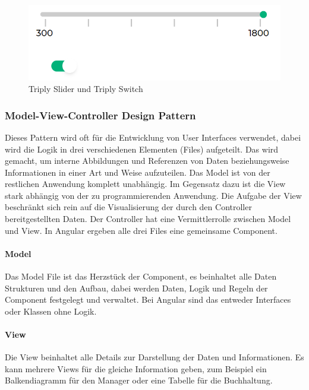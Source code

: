 \begin{figure}[hbt!]
    \centering
    \includegraphics[scale=1]{pics/triply-material-library}
    \caption{Triply Slider und Triply Switch}
    \label{fig:triply-material-library}
\end{figure}

\subsubsection{Model-View-Controller Design Pattern}
Dieses Pattern wird oft für die Entwicklung von User Interfaces verwendet,
dabei wird die Logik in drei verschiedenen Elementen (Files) aufgeteilt.
Das wird gemacht, um interne Abbildungen und Referenzen von Daten beziehungsweise Informationen
in einer Art und Weise aufzuteilen.
Das Model ist von der restlichen Anwendung komplett
unabhängig.
Im Gegensatz dazu ist die View stark abhängig von der zu programmierenden Anwendung.
Die Aufgabe der View beschränkt sich rein auf die Visualisierung der durch den Controller bereitgestellten Daten.
Der Controller hat eine Vermittlerrolle zwischen Model und View.
In Angular ergeben alle drei Files eine gemeinsame Component.

\paragraph{Model}
Das Model File ist das Herzstück der Component, es beinhaltet alle Daten
Strukturen und den Aufbau, dabei werden Daten, Logik und Regeln
der Component festgelegt und verwaltet.
Bei Angular sind das entweder Interfaces oder Klassen ohne Logik.
~\cite{angular-design-patterns}

\paragraph{View}
Die View beinhaltet alle Details zur Darstellung der Daten und Informationen.
Es kann mehrere Views für die gleiche Information geben, zum Beispiel ein
Balkendiagramm für den Manager oder eine Tabelle für die Buchhaltung.

